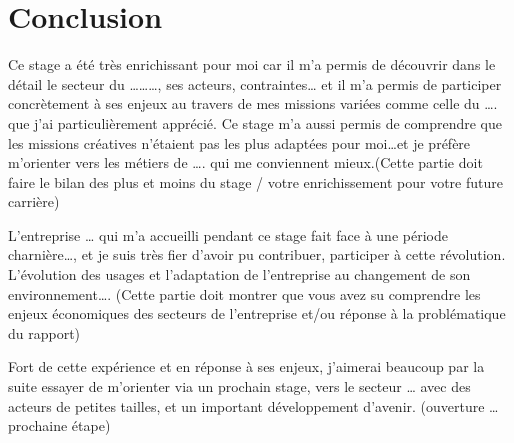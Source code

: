\documentclass{article}
\begin{document}
\newpage

\section{Conclusion}

Ce stage a été très enrichissant pour moi car il m’a permis de découvrir dans le détail le secteur du ………, ses acteurs, contraintes… et il m’a permis de participer concrètement à ses enjeux au travers de mes missions variées comme celle du …. que j’ai particulièrement apprécié. Ce stage m’a aussi permis de comprendre que les missions créatives n’étaient pas les plus adaptées pour moi…et je préfère m’orienter vers les métiers de …. qui me conviennent mieux.(Cette partie doit faire le bilan des plus et moins du stage / votre enrichissement pour votre future carrière)


L’entreprise … qui m’a accueilli pendant ce stage fait face à une période charnière…, et je suis très fier d’avoir pu contribuer, participer à cette révolution. L’évolution des usages et l’adaptation de l’entreprise au changement de son environnement….
(Cette partie doit montrer que vous avez su comprendre les enjeux économiques des secteurs de l’entreprise et/ou réponse à la problématique du rapport)


Fort de cette expérience et en réponse à ses enjeux, j’aimerai beaucoup par la suite essayer de m’orienter via un prochain stage, vers le secteur … avec des acteurs de petites tailles, et un important développement d’avenir.
(ouverture …prochaine étape)


\newpage
\end{document}
